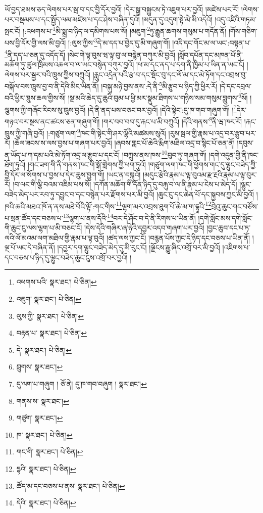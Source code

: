 ཡོ་བྱད་ཐམས་ཅད་ལེགས་པར་སྦ་བ་དང་བྱི་དོར་བྱའོ། །དེར་སྒྲ་བསྐྱུངས་ཏེ་འཇུག་པར་བྱའོ། །མཛེས་པར་རོ། །ལེགས་པར་བསྡམས་པ་དང་སྤྱོད་ལམ་མཛེས་པ་དང་ཤེས་བཞིན་དུའོ། །མདུན་དུ་འདུག་སྟེ་མེ་མི་འདེའོ། །འདུ་འཛིའི་གཏམ་སྤང་ངོ། །:འཕགས་པ་\footnote{འཕགས་པའི་  སྣར་ཐང་།  པེ་ཅིན། }མི་སྨྲ་བ་ཉིད་ལ་དམིགས་པས་སོ། །མཇུག་\footnote{འཇུག་  སྣར་ཐང་།  པེ་ཅིན། }ཏུ་རྒྱུན་ཆགས་གསུམ་པ་གདོན་ནོ། །གོས་གཅིག་པས་བྱི་དོར་གྱི་ལས་མི་བྱའོ། །:ལུས་ཀྱིས་\footnote{ལུས་ཀྱི་  སྣར་ཐང་།  པེ་ཅིན། }དེ་མ་དད་པ་བྱེད་དུ་མི་གཞུག་གོ། །འདི་དང་གོང་མ་ལ་ཡང་:བསྟན་པ་\footnote{བརྟན་པ་  སྣར་ཐང་།  པེ་ཅིན། }ནི་དད་པ་ཅན་དུ་འདོད་དོ། །སེང་གེ་ལྟ་བུས་ཝ་ལྟ་བུ་ལ་བསྙེན་བཀུར་མི་བྱའོ། །སློབ་དཔོན་དང་མཁན་པོ་ནི་མཆོག་ཏུ་ཚུལ་ཁྲིམས་འཆལ་བ་ལ་ཡང་བསྙེན་བཀུར་བྱའོ། །ཕ་མ་དང་ནད་པ་དག་ནི་ཁྱིམ་པ་ཡིན་ན་ཡང་ངོ། །ལེགས་པར་སྦྱར་བའི་ཁྲུས་ཀྱིས་བཀྲུའོ། །རླུང་འདྲེན་པའི་རྩ་བ་དང་སྡོང་བུ་དང་ལོ་མ་དང་མེ་ཏོག་དང་འབྲས་བུ་བསྐོལ་བས་ཁྲུས་བྱ་བ་ནི་དེའི་མིང་ཡིན་ནོ། །བསྐུ་མཉེ་བྱས་ནས་:དེ་ནི་\footnote{དེ་  སྣར་ཐང་།  པེ་ཅིན། }མི་རྩུབ་པ་ཉིད་ཀྱི་ཕྱིར་རོ། །དེ་དང་དབྲལ་བའི་ཕྱིར་ཁྲུས་ཆལ་གྱིས་སོ། །སྔ་མའི་ཆེད་དུ་ཆུའི་བུམ་པ་ཕྱི་མར་སྣུམ་ཐིགས་པ་གཉིས་སམ་གསུམ་བླུགས་\footnote{བྲུགས་  སྣར་ཐང་། }སོ། །ལྕགས་ཀྱི་གཞོང་རིངས་སུ་ཁྲུས་བྱའོ། །དེ་ནི་ནད་པས་བཅང་བར་བྱའོ། །དེའི་སྟེང་:དུ་ཁ་གབ་གཞུག་གོ། །\footnote{དུ་ལག་པ་གཞུག །  ཅོ་ནེ། དུ་ཁ་གབ་བཞུག །  སྣར་ཐང་། }དེར་གཉའ་བར་སྔས་ནང་ཚངས་ཅན་གཞུག་གོ། །གར་བབ་བབ་དུ་རྐང་པ་མི་བཀྲུའོ། །དེའི་གནས་\footnote{གནས་ས་  སྣར་ཐང་། }ནི་ཝ་ཁར་རོ། །རྐང་ཁྲུས་ཀྱི་གཞི་བྱའོ། །:གཙུག་ལག་\footnote{གཙུག་  སྣར་ཐང་། }ཁང་གི་སྟེང་གི་ཤར་ལྷོའི་མཚམས་སུའོ། །རུས་སྦལ་གྱི་རྣམ་པ་འདྲ་བར་རྩུབ་པར་རོ། །ཆོལ་ཟངས་ས་ལས་བྱས་པ་གཞག་པར་བྱའོ། །ཞབས་གླང་པོ་ཆེའི་རྨིག་མཐིལ་འདྲ་བ་སྙིང་པོ་ཅན་ནོ། །དབུས་ན་ཡོད་པ་ཀ་དམ་པའི་མེ་ཏོག་འདྲ་ལ་རྩུབ་པ་དང་ངོ། །བཀྲུས་ནས་ཁས་\footnote{ཁ་  སྣར་ཐང་།  པེ་ཅིན། }བུབ་ཏུ་གཞག་གོ། །དགེ་འདུན་གྱི་ནི་ཁང་ཐོག་ཏུའོ། །གང་ཟག་གི་ནི་གནས་ཁང་གི་སྒོ་གླེགས་ཀྱི་ཕག་ཏུའོ། །གཙུག་ལག་ཁང་གི་ཕྱོགས་གང་དུ་ལྷུང་བཟེད་ཀྱི་བྱི་དོར་ལ་སོགས་པ་བྱས་པ་དེར་ཆུས་བྱུག་གོ། །ཡང་ན་བསྐུའོ། །མདུང་རྩེའི་རྣམ་པ་ལྟ་བུའམ་རྫ་རྔའི་རྣམ་པ་ལྟ་བུར་རོ། །བ་ལང་གི་ལྕི་བའམ་འཇིམ་པས་སོ། །དཀོན་མཆོག་གི་དོན་ཉིད་དུ་བརྐུ་བ་ལ་ནི་རྣམ་པ་ངེས་པ་མེད་དོ། །ལྷུང་བཟེད་མེད་པར་རབ་ཏུ་དབྱུང་བ་དང་བསྙེན་པར་རྫོགས་པར་མི་བྱའོ། །ཆུང་ངུ་དང་ཆེན་པོ་དང་སྐྱབས་ཀྱང་མི་བྱའོ། །ཁའི་ཆའི་མཐའ་ཁོ་ན་ནས་མཐེ་བོའི་ལྟོ་:གང་གིས་\footnote{གང་གི་  སྣར་ཐང་།  པེ་ཅིན། }ལྷག་མར་འབྲས་ཐུག་པོ་ཆེ་མ་ག་དྷཱའི་\footnote{དྷའི་  སྣར་ཐང་།  པེ་ཅིན། }བྲེའུ་ཆུང་གང་བཙོས་པ་སྲན་ཚོད་དང་བཅས་པ་\footnote{ཚོད་མ་དང་བཅས་པ་ནས་  སྣར་ཐང་།  པེ་ཅིན། }ལྷག་པ་ནས་དོའི་\footnote{དེའི་  སྣར་ཐང་།  པེ་ཅིན། }བར་དེ་ཤོང་བ་དེ་ནི་རིགས་པ་ཡིན་ནོ། །དགེ་སློང་མས་དགེ་སློང་གི་ཆུང་ངུ་ལས་ལྷག་པ་མི་བཅང་ངོ། །དེས་དེའི་གཞིར་ཞ་ཉེའི་དབྱར་འདབ་གཞག་པར་བྱའོ། །བྱང་ཆུབ་དང་པ་ཏ་ལའི་ལོ་མའམ་ལག་མཐིལ་གྱི་རྣམ་པ་ལྟ་བུའོ། །ཚད་ལས་ཀྱང་ངོ། །བརྙན་པོས་ཀྱང་དེ་ཉིད་དང་བཅས་པ་ཡིན་ནོ། །ལྔ་པོ་ཡང་དེ་བཞིན་ནོ། །དབྱར་དག་ལྷུང་བཟེད་མེད་དུ་མི་རུང་ངོ། །ལྗོངས་རྒྱུ་ཞིང་འགྲོ་བར་མི་བྱའོ། །འཇིགས་པ་དང་བཅས་པ་ཉིད་དུ་ལྷུང་བཟེད་ཆུང་ངུས་འགྲོ་བར་བྱའོ། །
